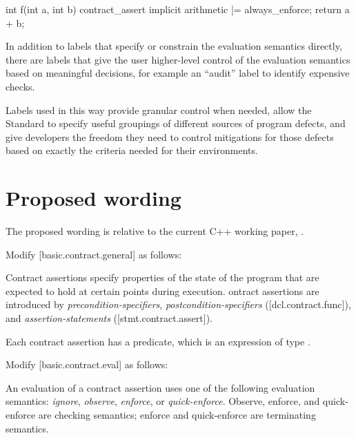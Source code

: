 {\begin{codeblock}
int f(int a, int b) {
  contract_assert implicit arithmetic |= always_enforce;
  return a + b;
}
\end{codeblock}

In addition to labels that specify or constrain the evaluation semantics directly, there are labels that give the user higher-level control of the evaluation semantics based on meaningful decisions, for example an ``audit'' label to identify expensive checks.

Labels used in this way provide granular control when needed, allow the Standard to
specify useful groupings of different sources of program defects, and give developers the freedom they
need to control mitigations for those defects based on exactly the criteria needed for their environments.

\section{Proposed wording}
\label{wording}

The proposed wording is relative to the current C++ working paper, \cite{N5008}.

Modify [basic.contract.general] as follows:

\begin{adjustwidth}{0.5cm}{0.5cm}
Contract assertions specify properties of the state of the program
that are expected to hold at certain points during execution. ontract assertions
are introduced by \emph{precondition-specifiers}, \emph{postcondition-specifiers} ([dcl.contract.func]),
and \emph{assertion-statements} ([stmt.contract.assert]). 

Each contract assertion has a predicate, which is an expression of type . 
\begin{note}
\end{note}
\end{adjustwidth}

Modify [basic.contract.eval] as follows:

\begin{adjustwidth}{0.5cm}{0.5cm}
An evaluation of a contract assertion uses one of the following  evaluation semantics: 
\emph{ignore}, 
\emph{observe}, 
\emph{enforce}, or 
\emph{quick-enforce}. 
Observe, enforce, and quick-enforce are checking semantics; enforce and quick-enforce are terminating semantics.


\end{adjustwidth}}
